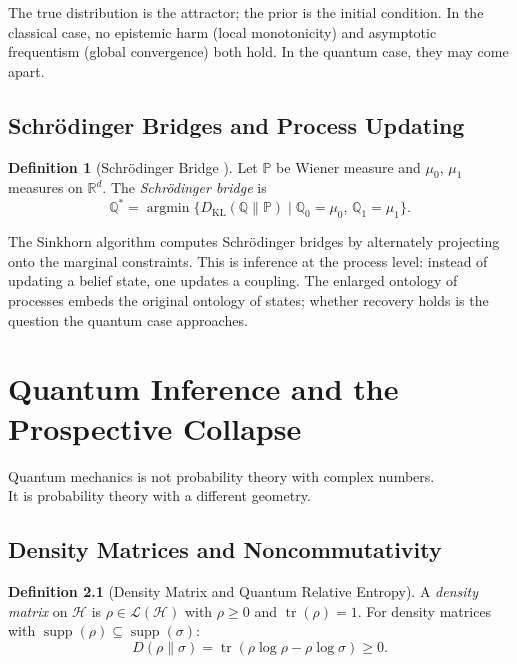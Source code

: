 \documentclass[12pt,oneside]{book}
\theoremstyle{plain}
\theoremstyle{definition}
\newtheorem{definition}[theorem]{Definition}
\theoremstyle{remark}
\newcommand{\supp}{\operatorname{supp}}
\newcommand{\tr}{\operatorname{tr}}
\newcommand{\KL}{D_{\mathrm{KL}}}
\newcommand{\Real}{\mathbb{R}}
\newcommand{\Hilb}{\mathcal{H}}
\begin{document}
The true distribution is the attractor; the prior is the initial condition.
In the classical case, no epistemic harm (local monotonicity) and asymptotic
frequentism (global convergence) both hold. In the quantum case, they may
come apart.

\section{Schr\"{o}dinger Bridges and Process Updating}

\begin{definition}[Schrödinger Bridge \cite{schrodinger1932}]
Let $\mathbb{P}$ be Wiener measure and $\mu_0$, $\mu_1$ measures on $\Real^d$.
The \emph{Schrödinger bridge} is
\[
  \mathbb{Q}^* = \operatorname{argmin}\{
  \KL(\mathbb{Q}\|\mathbb{P}) \mid \mathbb{Q}_0 = \mu_0,\,
  \mathbb{Q}_1 = \mu_1\}.
\]
\end{definition}

The Sinkhorn algorithm \cite{sinkhorn1967} computes Schrödinger bridges by
alternately projecting onto the marginal constraints. This is inference at
the process level: instead of updating a belief state, one updates a coupling.
The enlarged ontology of processes embeds the original ontology of states;
whether recovery holds is the question the quantum case approaches.

\chapter{Quantum Inference and the Prospective Collapse}

\epigraph{Quantum mechanics is not probability theory with complex numbers.\\
It is probability theory with a different geometry.}{}

\section{Density Matrices and Noncommutativity}

\begin{definition}[Density Matrix and Quantum Relative Entropy]
A \emph{density matrix} on $\Hilb$ is $\rho \in \mathcal{L}(\Hilb)$ with
$\rho \geq 0$ and $\tr(\rho) = 1$. For density matrices with
$\supp(\rho) \subseteq \supp(\sigma)$:
\[
  D(\rho\|\sigma) = \tr(\rho\log\rho - \rho\log\sigma) \geq 0.
\]
\end{definition}
\end{document}
